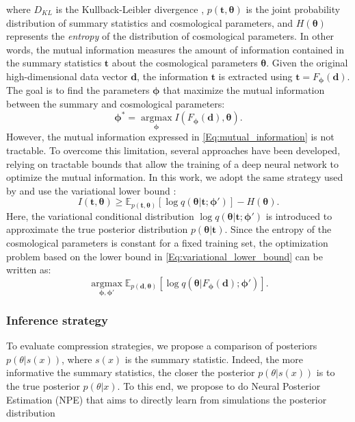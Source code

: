 \documentclass{aa}
\begin{document}
where $D_{KL}$ is the Kullback-Leibler divergence \citep{kullback1951information}, $p(\bm {t}, \bm {\theta})$ is the joint probability distribution of summary statistics and cosmological parameters, and $H(\bm {\theta})$ represents the \textit{entropy} of the distribution of cosmological parameters.  
In other words, the mutual information measures the amount of information contained in the summary statistics $\bm t$ about the cosmological parameters $\bm \theta$.
Given the original high-dimensional data vector $\bm d$, the information $\bm t$ is extracted using $\bm {t}=F_{\bm {\phi}}(\bm {d})$. 
The goal is to find the parameters $\bm {\phi}$ that maximize the mutual information between the summary and cosmological parameters:
\begin{equation}
   \bm {\phi}^*= \operatorname*{argmax}_{\bm {\phi}} I(F_{\bm {\phi}}(\bm{d}), \bm {\theta}).
\end{equation}
However, the mutual information expressed in \autoref{Eq:mutual_information} is not tractable. To overcome this limitation,  several approaches have been developed, relying on tractable bounds that allow the training of a deep neural network to optimize the mutual information. In this work, we adopt the same strategy used by \citet{jeffrey2021likelihood} and use the variational lower bound \citep{barber2003information}:
\begin{equation}\label{Eq:variational_lower_bound}
    I(\bm{t}, \bm{\theta}) \ge \mathbb{E}_{p(\bm {t}, \bm {\theta})} [\log{q(\bm {\theta} |\bm{t} ; \bm{\phi}')}]- H(\bm {\theta}).
\end{equation}
Here, the variational conditional distribution $\log{q(\bm {\theta} |\bm{t} ; \bm{\phi}')}$ is introduced to approximate the true posterior distribution $p(\bm{\theta}|\bm {t})$. 
Since the entropy of the cosmological parameters is constant for a fixed training set, the optimization problem based on the lower bound in  \autoref{Eq:variational_lower_bound} can be written as:
\begin{equation}
    \operatorname*{argmax}_{\bm {\phi}, \bm {\phi}'}\mathbb{E}_{p(\bm {d}, \bm {\theta})} [\log{q(\bm {\theta} |F_{\bm {\phi}}(\bm {d}) ; \bm{\phi}')}].
\end{equation}

\subsubsection{Inference strategy}
To evaluate compression strategies, we propose a comparison of posteriors $p(\theta|s(x))$, where $s(x)$ is the summary statistic. Indeed, the more informative the summary statistics, the closer the posterior $p(\theta | s(x))$ is to the true posterior $p (\theta | x)$. To this end, we propose to do Neural Posterior Estimation (NPE) that aims to directly learn from simulations the posterior distribution
\end{document}

